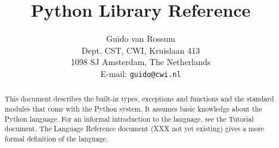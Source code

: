 

\newcommand{\cbstart}{}
\newcommand{\cbend}{}

\newcommand{\itembreak}{
	\mbox{}\\*[0mm]
}

\newcommand{\funcitem}[2]{\item[#1(#2)]}

\newcommand{\dataitem}[1]{\item[#1]}

\newcommand{\excitem}[2]{
\item[#1 = {\tt '#2'}]
\itembreak
}

\title{\bf
	Python Library Reference
}

\author{
	Guido van Rossum \\
	Dept. CST, CWI, Kruislaan 413 \\
	1098 SJ Amsterdam, The Netherlands \\
	E-mail: {\tt guido@cwi.nl}
}




\maketitle

\begin{abstract}

\noindent
This document describes the built-in types, exceptions and functions and
the standard modules that come with the Python system.
It assumes basic knowledge about the Python language.
For an informal introduction to the language, see the Tutorial document.
The Language Reference document (XXX not yet existing)
gives a more formal definition of the language.

\end{abstract}

\pagebreak

\tableofcontents

\pagebreak




